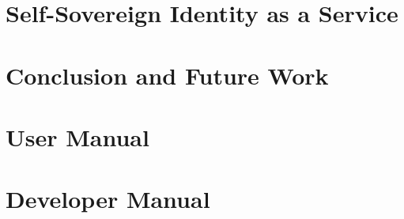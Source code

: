\documentclass[pdfa%
,twoside%
,12pt%
]{toptesi}
\begin{document}
\chapter{Self-Sovereign Identity as a Service}

\chapter{Conclusion and Future Work}



\appendix
\chapter{User Manual}

\chapter{Developer Manual}


%



\end{document}
